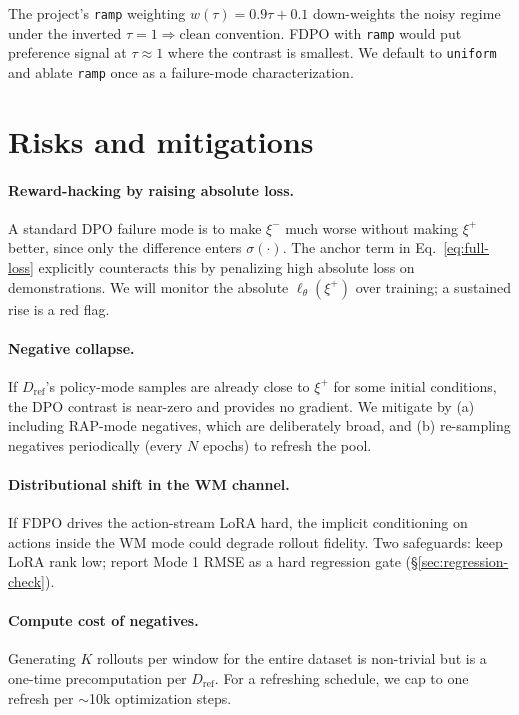 \documentclass[11pt]{article}
\newcommand{\Dref}{D_{\mathrm{ref}}}
\begin{document}
The project's \texttt{ramp} weighting $w(\tau) = 0.9\tau + 0.1$ down-weights the noisy regime under the inverted $\tau{=}1{\Rightarrow}\mathrm{clean}$ convention. FDPO with \texttt{ramp} would put preference signal at $\tau \approx 1$ where the contrast is smallest. We default to \texttt{uniform} and ablate \texttt{ramp} once as a failure-mode characterization.

\section{Risks and mitigations}
\label{sec:risks}

\paragraph{Reward-hacking by raising absolute loss.} A standard DPO failure mode is to make $\xi^-$ much worse without making $\xi^+$ better, since only the difference enters $\sigma(\cdot)$. The anchor term in Eq.~\eqref{eq:full-loss} explicitly counteracts this by penalizing high absolute loss on demonstrations. We will monitor the absolute $\ell_\theta(\xi^+)$ over training; a sustained rise is a red flag.

\paragraph{Negative collapse.} If $\Dref$'s policy-mode samples are already close to $\xi^+$ for some initial conditions, the DPO contrast is near-zero and provides no gradient. We mitigate by (a) including RAP-mode negatives, which are deliberately broad, and (b) re-sampling negatives periodically (every $N$ epochs) to refresh the pool.

\paragraph{Distributional shift in the WM channel.} If FDPO drives the action-stream LoRA hard, the implicit conditioning on actions inside the WM mode could degrade rollout fidelity. Two safeguards: keep LoRA rank low; report Mode 1 RMSE as a hard regression gate (\S\ref{sec:regression-check}).

\paragraph{Compute cost of negatives.} Generating $K$ rollouts per window for the entire dataset is non-trivial but is a one-time precomputation per $\Dref$. For a refreshing schedule, we cap to one refresh per $\sim$10k optimization steps.
\end{document}
